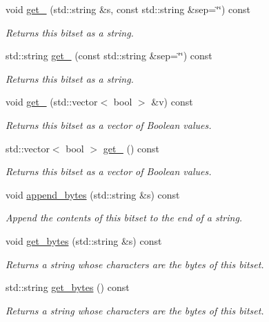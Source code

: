 \begin{DoxyCompactItemize}
void \hyperlink{classlgraph_1_1utils_1_1static__bitset_ad77eb6978b0361ed7ef7f4d9e66a96eb}{get\+\_} (std\+::string \&s, const std\+::string \&sep=\char`\"{}\char`\"{}) const
\begin{DoxyCompactList}\small\item\em Returns this bitset as a string. \end{DoxyCompactList}\item 
std\+::string \hyperlink{classlgraph_1_1utils_1_1static__bitset_acb29ba63f9a87346a591da639c55196d}{get\+\_} (const std\+::string \&sep=\char`\"{}\char`\"{}) const
\begin{DoxyCompactList}\small\item\em Returns this bitset as a string. \end{DoxyCompactList}\item 
void \hyperlink{classlgraph_1_1utils_1_1static__bitset_a37b11e14da1369678b7d862da959c988}{get\+\_} (std\+::vector$<$ bool $>$ \&v) const
\begin{DoxyCompactList}\small\item\em Returns this bitset as a vector of Boolean values. \end{DoxyCompactList}\item 
std\+::vector$<$ bool $>$ \hyperlink{classlgraph_1_1utils_1_1static__bitset_a51f45c5c6bbe8788d4d6c58695a19d49}{get\+\_} () const
\begin{DoxyCompactList}\small\item\em Returns this bitset as a vector of Boolean values. \end{DoxyCompactList}\item 
void \hyperlink{classlgraph_1_1utils_1_1static__bitset_a38978e91cd3e39ce45417a0f3d0d6162}{append\+\_\+bytes} (std\+::string \&s) const
\begin{DoxyCompactList}\small\item\em Append the contents of this bitset to the end of a string. \end{DoxyCompactList}\item 
void \hyperlink{classlgraph_1_1utils_1_1static__bitset_a9df9587947e8bc6aba28ac44f5ad76be}{get\+\_\+bytes} (std\+::string \&s) const
\begin{DoxyCompactList}\small\item\em Returns a string whose characters are the bytes of this bitset. \end{DoxyCompactList}\item 
std\+::string \hyperlink{classlgraph_1_1utils_1_1static__bitset_a71b6f834e2ba66943008e1382f09ecab}{get\+\_\+bytes} () const
\begin{DoxyCompactList}\small\item\em Returns a string whose characters are the bytes of this bitset. \end{DoxyCompactList}\end{DoxyCompactItemize}
